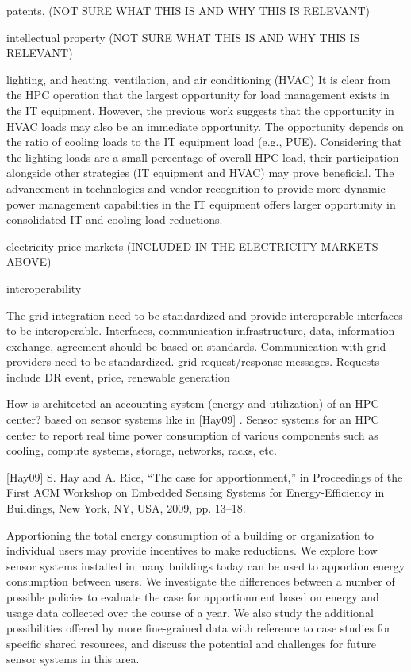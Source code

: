 patents, (NOT SURE WHAT THIS IS AND WHY THIS IS RELEVANT)

intellectual property (NOT SURE WHAT THIS IS AND WHY THIS IS RELEVANT)

lighting, and heating, ventilation, and air conditioning (HVAC)
It is clear from the HPC operation that the largest opportunity for load management exists in the IT equipment.
However, the previous work suggests that the opportunity in HVAC loads may also be an immediate opportunity. 
The opportunity depends on the ratio of cooling loads to the IT equipment load (e.g., PUE).
Considering that the lighting loads are a small percentage of overall HPC load, their participation alongside other strategies (IT equipment and HVAC) may prove beneficial. 
The advancement in technologies and vendor recognition to provide more dynamic power management capabilities in the IT equipment offers larger opportunity in consolidated IT and cooling load reductions.

electricity-price markets (INCLUDED IN THE ELECTRICITY MARKETS ABOVE)

interoperability

The grid integration need to be standardized and provide interoperable
interfaces to be interoperable. Interfaces, communication infrastructure,
data, information exchange, agreement should be based on standards.
Communication with grid providers need to be standardized. grid
request/response messages. Requests include DR event, price, renewable
generation


How is architected an accounting system (energy and utilization) of an HPC
center? based on sensor systems like in [Hay09] . Sensor systems for an HPC
center to report real time power consumption of various components such as
cooling, compute systems, storage, networks, racks, etc.

[Hay09] S. Hay and A. Rice, ``The case for apportionment,'' in Proceedings
of the First ACM Workshop on Embedded Sensing Systems for Energy-Efficiency
in Buildings, New York, NY, USA, 2009, pp. 13--18.

Apportioning the total energy consumption of a building or organization to
individual users may provide incentives to make reductions. We explore how
sensor systems installed in many buildings today can be used to apportion
energy consumption between users. We investigate the differences between a
number of possible policies to evaluate the case for apportionment based on
energy and usage data collected over the course of a year. We also study the
additional possibilities offered by more fine-grained data with reference to
case studies for specific shared resources, and discuss the potential and
challenges for future sensor systems in this area.

